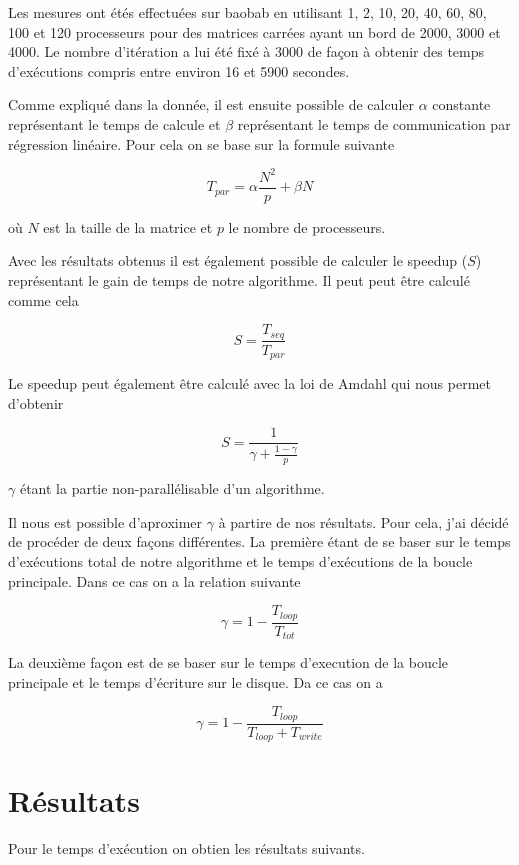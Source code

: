 \documentclass[12pt,a4paper,oneside, titlepage]{report}
\begin{document}
	Les mesures ont étés effectuées sur baobab en utilisant 1, 2, 10, 20, 40, 60, 80, 100 et 120 processeurs pour des matrices carrées ayant un bord de 2000, 3000 et 4000.
	Le nombre d'itération a lui été fixé à 3000 de façon à obtenir des temps d'exécutions compris entre environ 16 et 5900 secondes.

	Comme expliqué dans la donnée, il est ensuite possible de calculer $\alpha$ constante représentant le temps de calcule et $\beta$ représentant le temps de communication par régression linéaire.
	Pour cela on se base sur la formule suivante

	$$T_{par} = \alpha \frac{N^2}{p}+ \beta N$$

	où $N$ est la taille de la matrice et $p$ le nombre de processeurs.

	Avec les résultats obtenus il est également possible de calculer le speedup ($S$) représentant le gain de temps de notre algorithme.
	Il peut peut être calculé comme cela

	$$S = \frac{T_{seq}}{T_{par}}$$

	Le speedup peut également être calculé avec la loi de Amdahl qui nous permet d'obtenir

	$$S = \frac{1}{\gamma + \frac{1 - \gamma}{p}}$$

	$\gamma$ étant la partie non-parallélisable d'un algorithme.

	Il nous est possible d'aproximer $\gamma$ à partire de nos résultats.
	Pour cela, j'ai décidé de procéder de deux façons différentes.
	La première étant de se baser sur le temps d'exécutions total de notre algorithme et le temps d'exécutions de la boucle principale.
	Dans ce cas on a la relation suivante

	$$\gamma = 1- \frac{T_{loop}}{T_{tot}}$$

	La deuxième façon est de se baser sur le temps d'execution de la boucle principale et le temps d'écriture sur le disque.
	Da ce cas on a

	$$\gamma = 1- \frac{T_{loop}}{T_{loop} + T_{write}}$$

	\newpage

	\section*{Résultats}

	Pour le temps d'exécution on obtien les résultats suivants.
\end{document}
